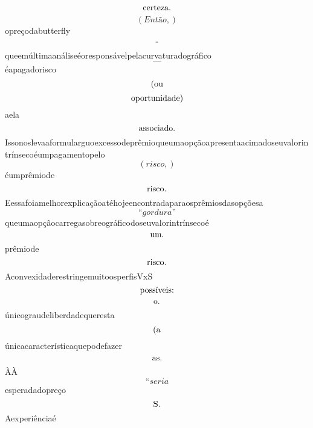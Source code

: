 \documentclass{article}
\begin{document}
\begin{equation}
$certeza.$
\end{equation}\begin{equation}
\left( Então,\right)
\end{equation}opreçodabutterfly\begin{equation}
$-$
\end{equation}queemúltimaanáliseéoresponsávelpelacurvaturadográfico\begin{equation}
—
\end{equation}éapagadorisco\begin{equation}
$(ou$
\end{equation}\begin{equation}
$oportunidade)$
\end{equation}aela\begin{equation}
$associado.$
\end{equation}Issonoslevaaformularguoexcessodeprêmioqueumaopçãoapresentaacimadoseuvalorintrínsecoéumpagamentopelo\begin{equation}
\left( risco,\right)
\end{equation}éumprêmiode\begin{equation}
$risco.$
\end{equation}Eessafoiamelhorexplicaçãoatéhojeencontradaparaosprêmiosdasopçõesa\begin{equation}
“gordura”
\end{equation}queumaopçãocarregasobreográficodoseuvalorintrínsecoé\begin{equation}
$um.$
\end{equation}prêmiode\begin{equation}
$risco.$
\end{equation}AconvexidaderestringemuitoosperfisVxS\begin{equation}
$possíveis:$
\end{equation}\begin{equation}
$o.$
\end{equation}únicograudeliberdadequeresta\begin{equation}
$(a$
\end{equation}únicacaracterísticaquepodefazer\begin{equation}
$as.$
\end{equation}ÀÀ\begin{equation}
“seria
\end{equation}esperadadopreço\begin{equation}
$S.$
\end{equation}Aexperiênciaé\begin{equation}

\end{equation}
\end{document}
